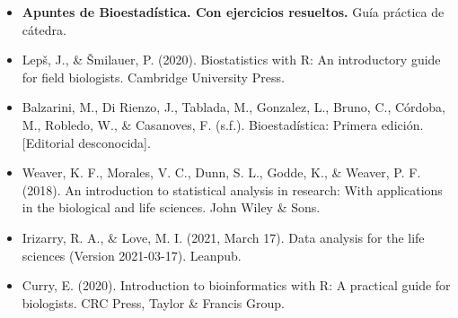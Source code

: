 \documentclass[
  spanish,
  letterpaper,
  DIV=11,
  numbers=noendperiod]{scrreprt}
\begin{document}
\begin{itemize}
\item
  \textbf{Apuntes de Bioestadística. Con ejercicios resueltos.} Guía
  práctica de cátedra.
\item
  Lepš, J., \& Šmilauer, P. (2020). Biostatistics with R: An
  introductory guide for field biologists. Cambridge University Press.
\item
  Balzarini, M., Di Rienzo, J., Tablada, M., Gonzalez, L., Bruno, C.,
  Córdoba, M., Robledo, W., \& Casanoves, F. (s.f.). Bioestadística:
  Primera edición. {[}Editorial desconocida{]}.
\item
  Weaver, K. F., Morales, V. C., Dunn, S. L., Godde, K., \& Weaver, P.
  F. (2018). An introduction to statistical analysis in research: With
  applications in the biological and life sciences. John Wiley \& Sons.
\item
  Irizarry, R. A., \& Love, M. I. (2021, March 17). Data analysis for
  the life sciences (Version 2021-03-17). Leanpub.
\item
  Curry, E. (2020). Introduction to bioinformatics with R: A practical
  guide for biologists. CRC Press, Taylor \& Francis Group.
\end{itemize}
\end{document}
